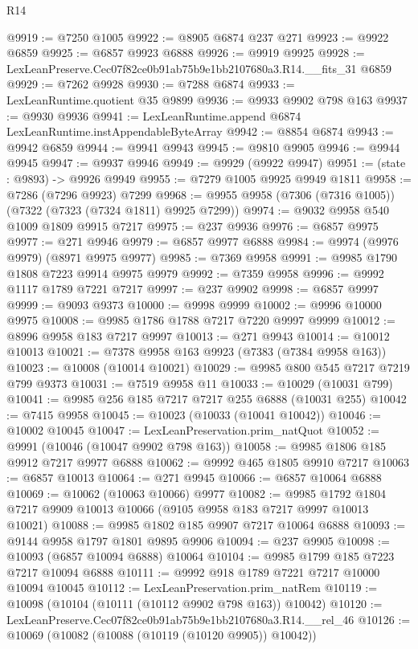 \begin{lexlean}{R14}
\begin{coremodule}
@9919 := @7250 @1005
@9922 := @8905 @6874 @237 @271
@9923 := @9922 @6859
@9925 := @6857 @9923 @6888
@9926 := @9919 @9925
@9928 := LexLeanPreserve.Cec07f82ce0b91ab75b9e1bb2107680a3.R14.__fits_31 @6859
@9929 := @7262 @9928
@9930 := @7288 @6874
@9933 := LexLeanRuntime.quotient @35 @9899
@9936 := @9933 @9902 @798 @163
@9937 := @9930 @9936
@9941 := LexLeanRuntime.append @6874 LexLeanRuntime.instAppendableByteArray
@9942 := @8854 @6874
@9943 := @9942 @6859
@9944 := @9941 @9943
@9945 := @9810 @9905
@9946 := @9944 @9945
@9947 := @9937 @9946
@9949 := @9929 (@9922 @9947)
@9951 := (state : @9893) -> @9926 @9949
@9955 := @7279 @1005 @9925 @9949 @1811
@9958 := @7286 (@7296 @9923) @7299
@9968 := @9955 @9958 (@7306 (@7316 @1005)) (@7322 (@7323 (@7324 @1811) @9925 @7299))
@9974 := @9032 @9958 @540 @1009 @1809 @9915 @7217
@9975 := @237 @9936
@9976 := @6857 @9975
@9977 := @271 @9946
@9979 := @6857 @9977 @6888
@9984 := @9974 (@9976 @9979) (@8971 @9975 @9977)
@9985 := @7369 @9958
@9991 := @9985 @1790 @1808 @7223 @9914 @9975 @9979
@9992 := @7359 @9958
@9996 := @9992 @1117 @1789 @7221 @7217
@9997 := @237 @9902
@9998 := @6857 @9997
@9999 := @9093 @9373
@10000 := @9998 @9999
@10002 := @9996 @10000 @9975
@10008 := @9985 @1786 @1788 @7217 @7220 @9997 @9999
@10012 := @8996 @9958 @183 @7217 @9997
@10013 := @271 @9943
@10014 := @10012 @10013
@10021 := @7378 @9958 @163 @9923 (@7383 (@7384 @9958 @163))
@10023 := @10008 (@10014 @10021)
@10029 := @9985 @800 @545 @7217 @7219 @799 @9373
@10031 := @7519 @9958 @11
@10033 := @10029 (@10031 @799)
@10041 := @9985 @256 @185 @7217 @7217 @255 @6888 (@10031 @255)
@10042 := @7415 @9958
@10045 := @10023 (@10033 (@10041 @10042))
@10046 := @10002 @10045
@10047 := LexLeanPreservation.prim_natQuot
@10052 := @9991 (@10046 (@10047 @9902 @798 @163))
@10058 := @9985 @1806 @185 @9912 @7217 @9977 @6888
@10062 := @9992 @465 @1805 @9910 @7217
@10063 := @6857 @10013
@10064 := @271 @9945
@10066 := @6857 @10064 @6888
@10069 := @10062 (@10063 @10066) @9977
@10082 := @9985 @1792 @1804 @7217 @9909 @10013 @10066 (@9105 @9958 @183 @7217 @9997 @10013 @10021)
@10088 := @9985 @1802 @185 @9907 @7217 @10064 @6888
@10093 := @9144 @9958 @1797 @1801 @9895 @9906
@10094 := @237 @9905
@10098 := @10093 (@6857 @10094 @6888) @10064
@10104 := @9985 @1799 @185 @7223 @7217 @10094 @6888
@10111 := @9992 @918 @1789 @7221 @7217 @10000 @10094 @10045
@10112 := LexLeanPreservation.prim_natRem
@10119 := @10098 (@10104 (@10111 (@10112 @9902 @798 @163)) @10042)
@10120 := LexLeanPreserve.Cec07f82ce0b91ab75b9e1bb2107680a3.R14.__rel_46
@10126 := @10069 (@10082 (@10088 (@10119 (@10120 @9905)) @10042))

\end{coremodule}
\end{lexlean}
